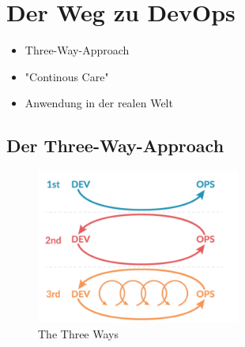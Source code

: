 \chapter{Der Weg zu DevOps} %

\begin{itemize}
\item Three-Way-Approach
\item "Continous Care"
\item Anwendung in der realen Welt
\end{itemize}

\section{Der Three-Way-Approach}

\begin{figure}[h]
\centering
\includegraphics[width=0.6\textwidth]{Graphics/three_ways}
\caption{The Three Ways \cite{curra:2020}}
\end{figure}
